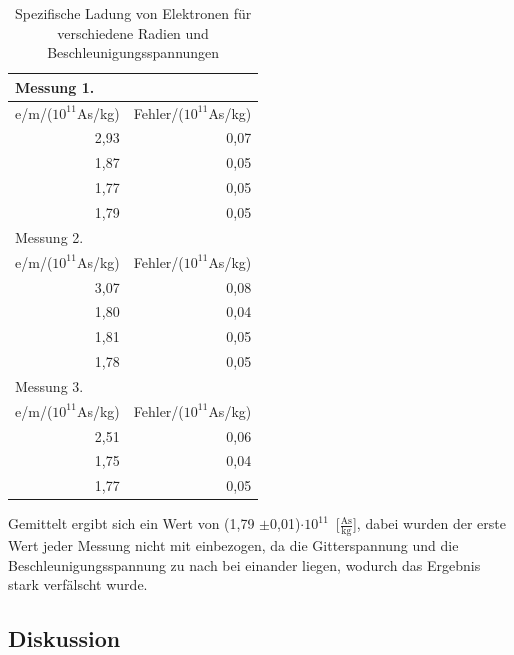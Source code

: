 \documentclass[12pt,a4paper]{article}
\begin{document}
\begin{table}[htbp]
\caption{Spezifische Ladung von Elektronen für verschiedene Radien und Beschleunigungsspannungen}
\begin{center}
\begin{tabular}{|r|r|}
\hline
\multicolumn{1}{|l|}{Messung 1.} & \multicolumn{1}{l|}{} \\ \hline
\multicolumn{1}{|l|}{e/m/($10^{11}$As/kg)} & \multicolumn{1}{l|}{Fehler/($10^{11}$As/kg)} \\ \hline
2,93 & 0,07 \\ \hline
1,87 & 0,05 \\ \hline
1,77 & 0,05 \\ \hline
1,79 & 0,05 \\ \hline \hline
\multicolumn{1}{|l|}{Messung 2.} & \multicolumn{1}{l|}{} \\ \hline
\multicolumn{1}{|l|}{e/m/($10^{11}$As/kg)} & \multicolumn{1}{l|}{Fehler/($10^{11}$As/kg)} \\ \hline
3,07 & 0,08 \\ \hline
1,80 & 0,04 \\ \hline
1,81 & 0,05 \\ \hline
1,78 & 0,05 \\ \hline \hline
\multicolumn{1}{|l|}{Messung 3.} & \multicolumn{1}{l|}{} \\ \hline
\multicolumn{1}{|l|}{e/m/($10^{11}$As/kg)} & \multicolumn{1}{l|}{Fehler/($10^{11}$As/kg)} \\ \hline
2,51 & 0,06 \\ \hline
1,75 & 0,04 \\ \hline
1,77 & 0,05 \\ \hline
\end{tabular}
\end{center}
\label{tab:aus_e/m}
\end{table}

Gemittelt ergibt sich ein Wert von \unit{(1,79 $\pm$0,01)$\cdot 10^{11}$}[$\frac{\text{As}}{\text{kg}}$], dabei wurden der erste Wert jeder Messung nicht mit einbezogen, da die Gitterspannung und die Beschleunigungsspannung zu nach bei einander liegen, wodurch das Ergebnis stark verfälscht wurde.

\subsection{Diskussion}
\end{document}
